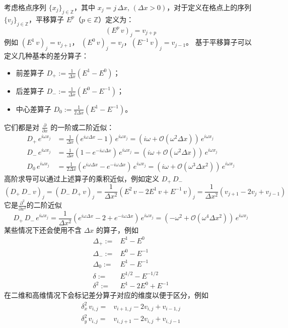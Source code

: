 考虑格点序列 $\{x_j\}_{j \in \mathbb{Z}}$，其中 $x_j = j \, \Delta x,\,(\Delta x > 0)$，对于定义在格点上的序列 $\{v_j\}_{j \in \mathbb{Z}}$，平移算子 $E^p$（$p \in \mathbb{Z}$）定义为：
\[
    (E^p\,v)_j = v_{j+p}
\]
例如 $(E^{1}\,v)_j = v_{j+1}$， $(E^{0}\,v)_j = v_j$，$(E^{-1}\,v)_j = v_{j-1}$。
基于平移算子可以定义几种基本的差分算子：
\begin{itemize}
    \item 前差算子 $D_+ := \frac1{\Delta x}(E^1 - E^{0})$；
    \item 后差算子 $D_- := \frac1{\Delta x}(E^0 - E^{-1})$；
    \item 中心差算子 $D_0 := \frac1{2\Delta x}(E^1 - E^{-1})$。
\end{itemize}
它们都是对 $\frac{\partial}{\partial x}$ 的一阶或二阶近似：
\begin{align*}
    D_+\,e^{i \omega x_j} & = \frac1{\Delta x} (e^{i \omega \Delta x} -  1)\, e^{i \omega x_j} = (i \omega + \mathcal{O}(\omega^2 \Delta x)) \,e^{i \omega x_j}                        \\
    D_-\,e^{i \omega x_j} & = \frac1{\Delta x} (1 - e^{-i \omega \Delta x})\, e^{i \omega x_j} = (i \omega + \mathcal{O}(\omega^2 \Delta x)) \,e^{i \omega x_j}                        \\
    D_0\,e^{i \omega x_j} & = \frac1{2\Delta x} (e^{i \omega \Delta x} - e^{-i \omega \Delta x})\, e^{i \omega x_j} = (i \omega + \mathcal{O}(\omega^3 \Delta x^2))\, e^{i \omega x_j}
\end{align*}
高阶求导可以通过上述算子的乘积近似，例如定义 $D_+\,D_-$
\[
    (D_+\,D_- \,v)_j = (D_-\,D_+ \,v)_j =
    \frac{1}{\Delta x^2}(E^2\,v - 2E^1\,v + E^{-1}\,v)_j
    = \frac{1}{\Delta x^2}(v_{j+1} - 2v_{j} + v_{j-1})
\]
它是$\frac{\partial^2}{\partial x^2}$的二阶近似
\[
    D_+\,D_- \,e^{i \omega x_j}
    = \frac{1}{\Delta x^2}(e^{i \omega \Delta x}-2+e^{-i \omega \Delta x})\,e^{i \omega x_j}
    = (-\omega^2 + \mathcal{O}(\omega^4 \Delta x^2))\,e^{i \omega x_j}
\]
某些情况下还会使用不含 $\Delta x$ 的算子，例如
\begin{align*}
    \Delta_+ :={} & E^1 - E^{0}           \\
    \Delta_- :={} & E^0 - E^{-1}          \\
    \Delta_0 :={} & E^1 - E^{-1}          \\
    \delta :={}   & E^{1/2} - E^{-1/2}    \\
    \delta^2 :={} & E^1  - 2 E^0 + E^{-1}
\end{align*}
在二维和高维情况下会标记差分算子对应的维度以便于区分，例如
\begin{align*}
    \delta_x^2 \, v_{i,j} ={} & v_{i+1,j} - 2 v_{i,j} + v_{i-1,j} \\
    \delta_y^2 \, v_{i,j} ={} & v_{i,j+1} - 2 v_{i,j} + v_{i,j-1}
\end{align*}

